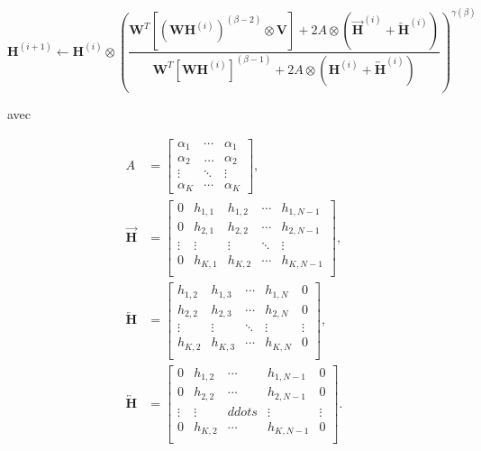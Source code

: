 \begin{equation}
\textbf{H}^{(i+1)} \leftarrow \textbf{H}^{(i)} \otimes\left(\frac{\textbf{W}^T \left[\left(\textbf{WH}^{(i)} \right)^{(\beta-2)} \otimes \textbf{V} \right] + 2 A \otimes \left(\overrightarrow{\mathbf{H}}^{(i)} + \overleftarrow{\mathbf{H}}^{(i)} \right)}{\textbf{W}^T \left[\textbf{WH}^{(i)} \right]^{(\beta-1)} + 2 A \otimes \left(\mathbf{H}^{(i)} + \overleftrightarrow{\mathbf{H}}^{(i)} \right)}\right)^{\gamma(\beta)}\label{eq:HupdateSmooth}
\end{equation}

avec 

\begin{subequations}
\begin{align}
    A &= 
\begin{bmatrix} 
\alpha_1 &  \cdots & \alpha_1  \\ 
\alpha_2 & \dots & \alpha_2  \\ 
\vdots & \ddots &  \vdots \\
\alpha_K & \cdots & \alpha_K
\end{bmatrix}, \label{eq:subeq1}\\
    \overrightarrow{\mathbf{H}} &= 
\begin{bmatrix}
0 & h_{1,1} & h_{1,2} & \cdots & h_{1,N-1}\\
0 & h_{2,1} & h_{2,2} & \cdots & h_{2,N-1}\\
\vdots & \vdots & \vdots & \ddots & \vdots\\
0 & h_{K,1} & h_{K,2} & \cdots & h_{K,N-1}\\
\end{bmatrix}, \label{eq:subeq2}\\
    \overleftarrow{\mathbf{H}} &= 
\begin{bmatrix}
h_{1,2} & h_{1,3} & \cdots & h_{1,N} & 0\\
h_{2,2} & h_{2,3} & \cdots & h_{2,N} & 0\\
\vdots & \vdots & \ddots & \vdots & \vdots\\
h_{K,2} & h_{K,3} & \cdots & h_{K,N} & 0\\
\end{bmatrix}, \label{eq:subeq3}\\
    \overleftrightarrow{\mathbf{H}} &= 
\begin{bmatrix}
0 & h_{1,2} & \cdots & h_{1,N-1} & 0\\
0 & h_{2,2} & \cdots & h_{2,N-1} & 0\\
\vdots & \vdots & ddots & \vdots & \vdots\\
0 & h_{K,2} & \cdots & h_{K,N-1} & 0\\
\end{bmatrix}. \label{eq:subeq5}
\end{align}
\end{subequations}

